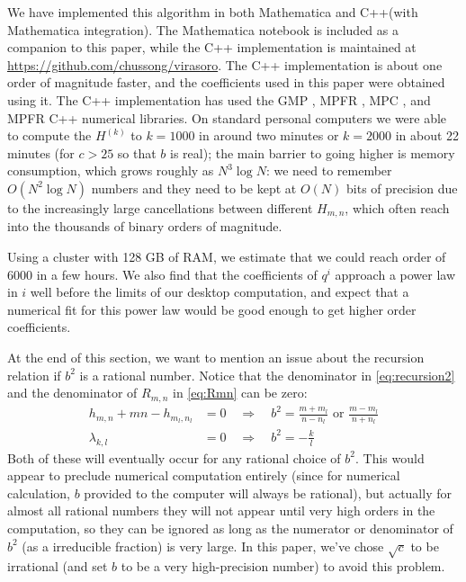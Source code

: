 We have implemented this algorithm in both Mathematica and C++(with Mathematica integration). The Mathematica notebook is included as a companion to this paper, while the C++ implementation  is maintained at \url{https://github.com/chussong/virasoro}. The C++ implementation is about one order of magnitude faster, and the coefficients used in this paper were obtained using it. The C++ implementation has used the GMP \cite{gnu:gmp}, MPFR \cite{gnu:mpfr}, MPC \cite{gnu:mpc}, and MPFR C++ \cite{gnu:mpfrcpp} numerical libraries. On standard personal computers we were able to compute the $H^{(k)}$ to $k=1000$ in around two minutes or $k=2000$ in about 22 minutes (for $c>25$ so that $b$ is real); the main barrier to going higher is memory consumption, which grows roughly as $N^3 \log N$: we need to remember $O(N^2 \log N)$ numbers and they need to be kept at $O(N)$ bits of precision due to the increasingly large cancellations between different $H_{m,n}$, which often reach into the thousands of binary orders of magnitude. 

Using a cluster with 128 GB of RAM, we estimate that we could reach order of $6000$ in a few hours. We also find that the coefficients of $q^i$ approach a power law in 
$i$ well before the limits of our desktop computation, and expect that a numerical fit for 
this power law would be good enough to get higher order coefficients.

At the end of this section, we want to mention an issue about the recursion relation if $b^2$ is a rational number. Notice that the denominator in \ref{eq:recursion2} and the denominator of $R_{m,n}$ in \ref{eq:Rmn} can be zero:
 \begin{align}
	h_{m,n} + mn - h_{m_l,n_l} &= 0\quad \Rightarrow \quad b^2=\frac{m+m_l}{n-n_l} \text{ or } \frac{m-m_l}{n+n_l}\\
	\lambda_{k,l} &=0\quad \Rightarrow \quad b^2=-\frac{k}{l}
	\end{align}
Both of these will eventually occur for any rational choice of $b^2$.  This would appear to preclude numerical computation entirely (since for numerical calculation, $b$ provided to the computer will always be rational), but actually for almost all rational numbers they will not appear until very high orders in the computation, so they can be ignored as long as the numerator or denominator of $b^2$ (as a irreducible fraction) is very large. In this paper, we've chose $\sqrt{c}$ to be irrational (and set $b$ to be a very high-precision number) to avoid this problem.


